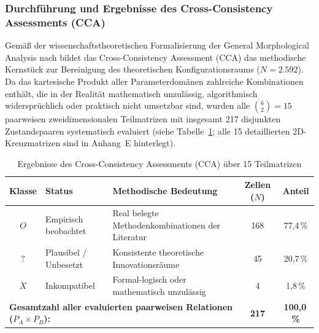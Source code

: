 \subsubsection{Durchführung und Ergebnisse des Cross-Consistency Assessments (CCA)}
\label{subsubsec:cca_ergebnisse}

Gemäß der wissenschaftstheoretischen Formalisierung der General Morphological Analysis nach \textcite[S.~83 bis 86]{Z6N6V5L9} bildet das Cross-Consistency Assessment (CCA) das methodische Kernstück zur Bereinigung des theoretischen Konfigurationsraums ($N = 2.592$). Da das kartesische Produkt aller Parameterdomänen zahlreiche Kombinationen enthält, die in der Realität mathematisch unzulässig, algorithmisch widersprüchlich oder praktisch nicht umsetzbar sind, wurden alle $\binom{6}{2} = 15$ paarweisen zweidimensionalen Teilmatrizen mit insgesamt 217 disjunkten Zustandspaaren systematisch evaluiert (siehe Tabelle~\ref{tab:cca_uebersicht}; alle 15 detaillierten 2D-Kreuzmatrizen sind in Anhang~E hinterlegt).

\begin{table}[htbp]
  \centering
  \small
  \caption{Ergebnisse des Cross-Consistency Assessments (CCA) über 15 Teilmatrizen}
  \label{tab:cca_uebersicht}
  \begin{tabularx}{\textwidth}{cl>{\raggedright\arraybackslash}Xcc}
    \toprule
    \textbf{Klasse} & \textbf{Status} & \textbf{Methodische Bedeutung} & \textbf{Zellen ($N$)} & \textbf{Anteil} \\
    \midrule
    $O$ & Empirisch beobachtet & Real belegte Methodenkombinationen der Literatur & 168 & 77,4\,\% \\
    $?$ & Plausibel / Unbesetzt & Konsistente theoretische Innovationsräume & 45 & 20,7\,\% \\
    $X$ & Inkompatibel & Formal-logisch oder mathematisch unzulässig & 4 & 1,8\,\% \\
    \midrule
    \multicolumn{3}{l}{\textbf{Gesamtzahl aller evaluierten paarweisen Relationen ($P_A \times P_B$):}} & \textbf{217} & \textbf{100,0\,\%} \\
    \bottomrule
  \end{tabularx}
\end{table}

